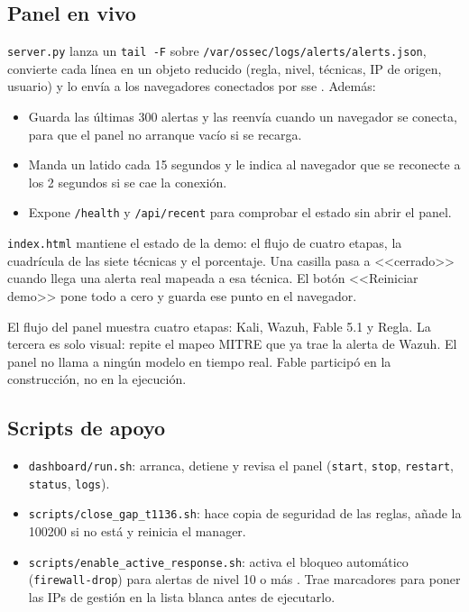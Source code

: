 \documentclass{mapc-proyecto}
\begin{document}
\subsection{Panel en vivo}\label{sec:panel}

\texttt{server.py} lanza un \texttt{tail -F} sobre
\texttt{/var/ossec/logs/alerts/alerts.json}, convierte cada línea en un objeto
reducido (regla, nivel, técnicas, IP de origen, usuario) y lo envía a los
navegadores conectados por \gls{sse} \parencite{whatwg-sse}. Además:

\begin{itemize}
  \item Guarda las últimas 300 alertas y las reenvía cuando un navegador se
        conecta, para que el panel no arranque vacío si se recarga.
  \item Manda un latido cada 15 segundos y le indica al navegador que se reconecte
        a los 2 segundos si se cae la conexión.
  \item Expone \texttt{/health} y \texttt{/api/recent} para comprobar el estado
        sin abrir el panel.
\end{itemize}

\texttt{index.html} mantiene el estado de la demo: el flujo de cuatro etapas, la
cuadrícula de las siete técnicas y el porcentaje. Una casilla pasa a
<<cerrado>> cuando llega una alerta real mapeada a esa técnica. El botón
<<Reiniciar demo>> pone todo a cero y guarda ese punto en el navegador.

\begin{nota}
El flujo del panel muestra cuatro etapas: Kali, Wazuh, Fable 5.1 y Regla. La
tercera es solo visual: repite el mapeo MITRE que ya trae la alerta de Wazuh. El
panel no llama a ningún modelo en tiempo real. Fable participó en la
construcción, no en la ejecución.
\end{nota}

\subsection{Scripts de apoyo}

\begin{itemize}
  \item \texttt{dashboard/run.sh}: arranca, detiene y revisa el panel
        (\texttt{start}, \texttt{stop}, \texttt{restart}, \texttt{status},
        \texttt{logs}).
  \item \texttt{scripts/close\_gap\_t1136.sh}: hace copia de seguridad de las
        reglas, añade la 100200 si no está y reinicia el manager.
  \item \texttt{scripts/enable\_active\_response.sh}: activa el bloqueo automático
        (\texttt{firewall-drop}) para alertas de nivel 10 o más
        \parencite{wazuh-ar}. Trae marcadores para poner las IPs de gestión en
        la lista blanca antes de ejecutarlo.
\end{itemize}
\end{document}
